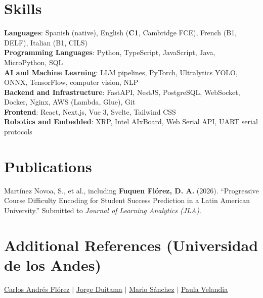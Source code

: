 \documentclass[a4paper,10pt]{article}
\newcommand{\link}[2]{\href{#1}{\uline{#2}}}
\begin{document}
\section{Skills}
\begin{itemize}[leftmargin=0.15in, label={}]
  \small{\item{
    \textbf{Languages}: Spanish (native), English (\textbf{C1}, Cambridge FCE), French (B1, DELF), Italian (B1, CILS) \\[1pt]
    \textbf{Programming Languages}: Python, TypeScript, JavaScript, Java, MicroPython, SQL \\[1pt]
    \textbf{AI and Machine Learning}: LLM pipelines, PyTorch, Ultralytics YOLO, ONNX, TensorFlow, computer vision, NLP \\[1pt]
    \textbf{Backend and Infrastructure}: FastAPI, NestJS, PostgreSQL, WebSocket, Docker, Nginx, AWS (Lambda, Glue), Git \\[1pt]
    \textbf{Frontend}: React, Next.js, Vue 3, Svelte, Tailwind CSS \\[1pt]
    \textbf{Robotics and Embedded}: XRP, Intel AIxBoard, Web Serial API, UART serial protocols
  }}
\end{itemize}

\vspace{3pt}
\section{Publications}
\begin{itemize}[leftmargin=0.15in, label={}]
  \small{\item{
    Martínez Novoa, S., et al., including \textbf{Fuquen Flórez, D. A.} (2026). ``Progressive Course Difficulty Encoding for Student Success Prediction in a Latin American University.'' Submitted to \textit{Journal of Learning Analytics (JLA)}.
  }}
\end{itemize}

\vspace{3pt}
\section{Additional References (Universidad de los Andes)}
\begin{itemize}[leftmargin=0.15in, label={}]
  \small{\item{
    \link{mailto:ca.florez@uniandes.edu.co}{Carlos Andrés Flórez} $|$
    \link{mailto:ja.duitama@uniandes.edu.co}{Jorge Duitama} $|$
    \link{mailto:mar-san1@uniandes.edu.co}{Mario Sánchez} $|$
    \link{mailto:pa.velandiar@uniandes.edu.co}{Paula Velandia}
  }}
\end{itemize}
\end{document}
